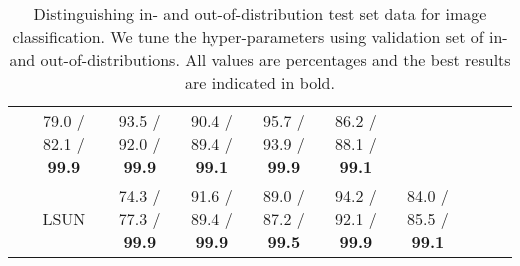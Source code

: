 \documentclass{article}
\begin{document}
\begin{table}[h]
{\begin{tabular}{@{}ccclclclll@{}}
& \multicolumn{1}{c}{79.0 / 82.1 / {\bf 99.9}}
& \multicolumn{1}{c}{93.5 / 92.0 / {\bf 99.9}}
& \multicolumn{1}{c}{90.4 / 89.4 / {\bf 99.1}}
& \multicolumn{1}{c}{95.7 / 93.9 / {\bf 99.9}}
& \multicolumn{1}{c}{86.2 / 88.1 / {\bf 99.1}}\\
& \multicolumn{1}{c}{LSUN} 
& \multicolumn{1}{c}{74.3 / 77.3 / {\bf 99.9}}
& \multicolumn{1}{c}{91.6 / 89.4 / {\bf 99.9}}
& \multicolumn{1}{c}{89.0 / 87.2 / {\bf 99.5}}
& \multicolumn{1}{c}{94.2 / 92.1 / {\bf 99.9}}
& \multicolumn{1}{c}{84.0 / 85.5 / {\bf 99.1}}\\ 
\bottomrule
\end{tabular}}
\vspace{+0.02in}
\caption{Distinguishing in- and out-of-distribution test set data for image classification.
We tune the hyper-parameters using validation set of in- and out-of-distributions. 
All values are percentages and the best results are indicated in bold.}
\label{tbl:out_main}
\end{table}
\end{document}
